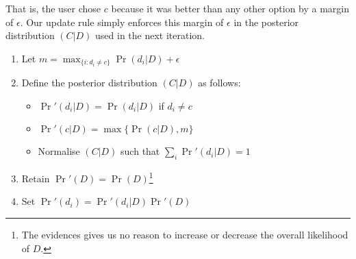 \documentclass[11pt,a4paper]{article}
\begin{document}
That is, the user chose $c$ because it was better than any other option by a
margin of $\epsilon$. Our update rule simply enforces this margin of
$\epsilon$ in the posterior distribution $(C|D)$ used in the next iteration.

\begin{enumerate}
  \item Let $m = \max_{\{i: d_i \ne c\}} \Pr(d_i|D) + \epsilon$
  \item Define the posterior distribution $(C|D)$ as follows:
  \begin{itemize}
    \item $\Pr'(d_i|D) = \Pr(d_i|D)$ if $d_i \ne c$
    \item $\Pr'(c|D) = \max\{\Pr(c|D), m\}$
    \item Normalise $(C|D)$ such that $\sum_i \Pr'(d_i|D) = 1$
  \end{itemize}
  \item Retain $\Pr'(D) = \Pr(D)$\footnote{The evidences gives us no reason to
    increase or decrease the overall likelihood of $D$.}
  \item Set $\Pr'(d_i) = \Pr'(d_i|D)\Pr'(D)$
\end{enumerate}
\end{document}
